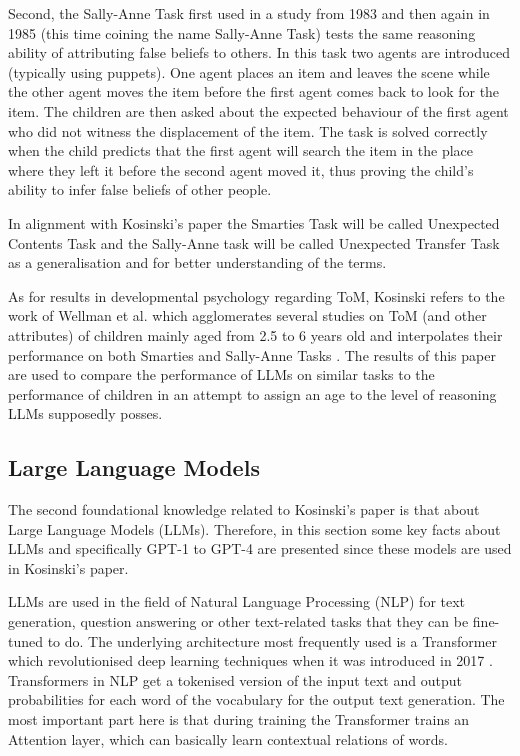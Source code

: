 Second, the Sally-Anne Task first used in a study from 1983 \cite{fb_test_places_1} and then again in 1985 \cite{fb_test_places_2} (this time coining the name Sally-Anne Task) tests the same reasoning ability of attributing false beliefs to others. In this task two agents are introduced (typically using puppets). One agent places an item and leaves the scene while the other agent moves the item before the first agent comes back to look for the item. The children are then asked about the expected behaviour of the first agent who did not witness the displacement of the item. The task is solved correctly when the child predicts that the first agent will search the item in the place where they left it before the second agent moved it, thus proving the child's ability to infer false beliefs of other people. \cite{fb_test_places_1,fb_test_places_2}

In alignment with Kosinski's paper the Smarties Task will be called Unexpected Contents Task and the Sally-Anne task will be called Unexpected Transfer Task as a generalisation and for better understanding of the terms.

As for results in developmental psychology regarding ToM, Kosinski refers to the work of Wellman et al. which agglomerates several studies on ToM (and other attributes) of children mainly aged from 2.5 to 6 years old and interpolates their performance on both Smarties and Sally-Anne Tasks \cite{tom_children_2001}. The results of this paper are used to compare the performance of LLMs on similar tasks to the performance of children in an attempt to assign an age to the level of reasoning LLMs supposedly posses.

\subsection{Large Language Models}
The second foundational knowledge related to Kosinski's paper is that about Large Language Models (LLMs). Therefore, in this section some key facts about LLMs and specifically GPT-1 to GPT-4 are presented since these models are used in Kosinski's paper.

LLMs are used in the field of Natural Language Processing (NLP) for text generation, question answering or other text-related tasks that they can be fine-tuned to do. The underlying architecture most frequently used is a Transformer which revolutionised deep learning techniques when it was introduced in 2017 \cite{attention}. Transformers in NLP get a tokenised version of the input text and output probabilities for each word of the vocabulary for the output text generation. The most important part here is that during training the Transformer trains an Attention layer, which can basically learn contextual relations of words.

